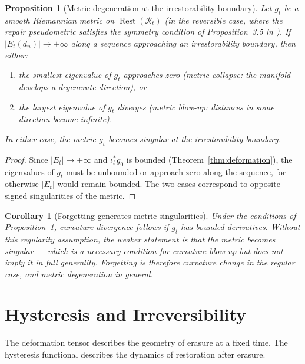 \documentclass[12pt, oneside]{article}
\theoremstyle{plain}
\newtheorem{proposition}[theorem]{Proposition}
\newtheorem{corollary}[theorem]{Corollary}
\theoremstyle{definition}
\theoremstyle{remark}
\DeclareMathOperator{\Rest}{Rest}
\newcommand{\Rt}{\mathcal{R}_t}
\newcommand{\Restzt}{\Rest(\Rt)}
\newcommand{\iotat}{\iota_t}
\newcommand{\Et}{E_t}
\newcommand{\gt}{g_t}
\newcommand{\gzero}{g_0}
\begin{document}
\begin{proposition}[Metric degeneration at the irrestorability boundary]
  Let $\gt$ be a smooth Riemannian metric on $\Restzt$ (in the
  reversible case, where the repair pseudometric satisfies the
  symmetry condition of Proposition~3.5 in \cite{Flyxion2026a}).
  If $|\Et(d_n)| \to +\infty$ along a sequence approaching an
  irrestorability boundary, then either:
  \begin{enumerate}
    \item the smallest eigenvalue of $\gt$ approaches zero
      (metric collapse: the manifold develops a degenerate
      direction), or
    \item the largest eigenvalue of $\gt$ diverges
      (metric blow-up: distances in some direction become
      infinite).
  \end{enumerate}
  In either case, the metric $\gt$ becomes singular at the
  irrestorability boundary.
  \label{prop:metric-degen}
\end{proposition}

\begin{proof}
  Since $|\Et| \to +\infty$ and $\iotat^* \gzero$ is bounded
  (Theorem~\ref{thm:deformation}), the eigenvalues of $\gt$ must
  be unbounded or approach zero along the sequence, for otherwise
  $|\Et|$ would remain bounded.
  The two cases correspond to opposite-signed singularities of the
  metric.
\end{proof}

\begin{corollary}[Forgetting generates metric singularities]
  Under the conditions of Proposition~\ref{prop:metric-degen},
  curvature divergence follows if $\gt$ has bounded derivatives.
  Without this regularity assumption, the weaker statement is that
  the metric becomes singular --- which is a necessary condition for
  curvature blow-up but does not imply it in full generality.
  Forgetting is therefore curvature change in the regular case, and
  metric degeneration in general.
\end{corollary}


\section{Hysteresis and Irreversibility}
\label{sec:hysteresis}

The deformation tensor describes the geometry of erasure at a fixed
time.
The hysteresis functional describes the dynamics of restoration
after erasure.
\end{document}
